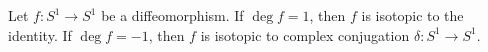 Let $f: S^1 \to S^1$ be a diffeomorphism. If $\deg f = 1$, then $f$ is isotopic to the identity. If $\deg f = -1$, then $f$ is isotopic to complex conjugation $\delta: S^1 \to S^1$.
